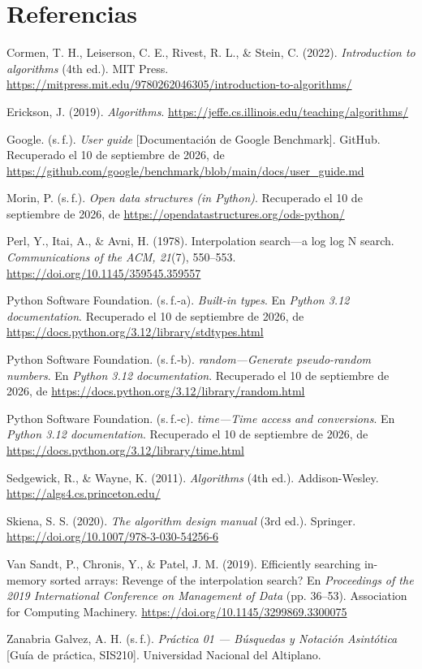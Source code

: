 \section*{Referencias}
\begingroup\fontsize{10}{12}\selectfont\setlength{\parskip}{8pt}
\newcommand{\referencia}[1]{\par\hangindent=1.27cm #1\par}
\referencia{Cormen, T. H., Leiserson, C. E., Rivest, R. L., \& Stein, C. (2022). \textit{Introduction to algorithms} (4th ed.). MIT Press. \url{https://mitpress.mit.edu/9780262046305/introduction-to-algorithms/}}
\referencia{Erickson, J. (2019). \textit{Algorithms}. \url{https://jeffe.cs.illinois.edu/teaching/algorithms/}}
\referencia{Google. (s.\,f.). \textit{User guide} [Documentación de Google Benchmark]. GitHub. Recuperado el 10 de septiembre de 2026, de \url{https://github.com/google/benchmark/blob/main/docs/user_guide.md}}
\referencia{Morin, P. (s.\,f.). \textit{Open data structures (in Python)}. Recuperado el 10 de septiembre de 2026, de \url{https://opendatastructures.org/ods-python/}}
\referencia{Perl, Y., Itai, A., \& Avni, H. (1978). Interpolation search---a log log N search. \textit{Communications of the ACM, 21}(7), 550--553. \url{https://doi.org/10.1145/359545.359557}}
\referencia{Python Software Foundation. (s.\,f.-a). \textit{Built-in types}. En \textit{Python 3.12 documentation}. Recuperado el 10 de septiembre de 2026, de \url{https://docs.python.org/3.12/library/stdtypes.html}}
\referencia{Python Software Foundation. (s.\,f.-b). \textit{random---Generate pseudo-random numbers}. En \textit{Python 3.12 documentation}. Recuperado el 10 de septiembre de 2026, de \url{https://docs.python.org/3.12/library/random.html}}
\referencia{Python Software Foundation. (s.\,f.-c). \textit{time---Time access and conversions}. En \textit{Python 3.12 documentation}. Recuperado el 10 de septiembre de 2026, de \url{https://docs.python.org/3.12/library/time.html}}
\referencia{Sedgewick, R., \& Wayne, K. (2011). \textit{Algorithms} (4th ed.). Addison-Wesley. \url{https://algs4.cs.princeton.edu/}}
\referencia{Skiena, S. S. (2020). \textit{The algorithm design manual} (3rd ed.). Springer. \url{https://doi.org/10.1007/978-3-030-54256-6}}
\referencia{Van Sandt, P., Chronis, Y., \& Patel, J. M. (2019). Efficiently searching in-memory sorted arrays: Revenge of the interpolation search? En \textit{Proceedings of the 2019 International Conference on Management of Data} (pp. 36--53). Association for Computing Machinery. \url{https://doi.org/10.1145/3299869.3300075}}
\referencia{Zanabria Galvez, A. H. (s.\,f.). \textit{Práctica 01 — Búsquedas y Notación Asintótica} [Guía de práctica, SIS210]. Universidad Nacional del Altiplano.}
\endgroup

